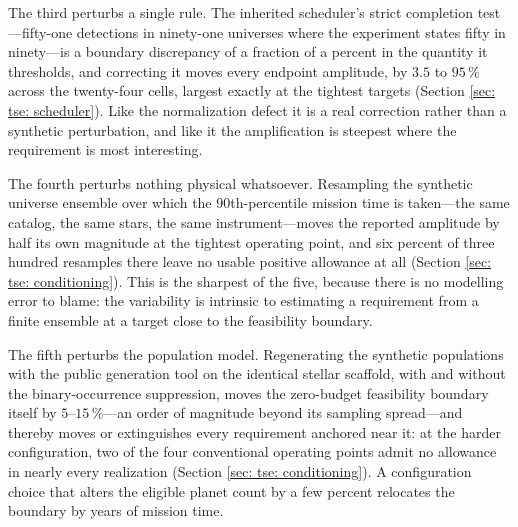 \documentclass[12pt,a4paper]{article}
\numberwithin{equation}{section}
\numberwithin{figure}{section}
\numberwithin{table}{section}
\begin{document}
The third perturbs a single rule. The inherited scheduler's strict completion test---fifty-one detections in ninety-one universes where the experiment states fifty in ninety---is a boundary discrepancy of a fraction of a percent in the quantity it thresholds, and correcting it moves every endpoint amplitude, by $3.5$ to $95\,\%$ across the twenty-four cells, largest exactly at the tightest targets (Section \ref{sec: tse: scheduler}). Like the normalization defect it is a real correction rather than a synthetic perturbation, and like it the amplification is steepest where the requirement is most interesting.

The fourth perturbs nothing physical whatsoever. Resampling the synthetic universe ensemble over which the 90th-percentile mission time is taken---the same catalog, the same stars, the same instrument---moves the reported amplitude by half its own magnitude at the tightest operating point, and six percent of three hundred resamples there leave no usable positive allowance at all (Section \ref{sec: tse: conditioning}). This is the sharpest of the five, because there is no modelling error to blame: the variability is intrinsic to estimating a requirement from a finite ensemble at a target close to the feasibility boundary.

The fifth perturbs the population model. Regenerating the synthetic populations with the public generation tool on the identical stellar scaffold, with and without the binary-occurrence suppression, moves the zero-budget feasibility boundary itself by $5$--$15\,\%$---an order of magnitude beyond its sampling spread---and thereby moves or extinguishes every requirement anchored near it: at the harder configuration, two of the four conventional operating points admit no allowance in nearly every realization (Section \ref{sec: tse: conditioning}). A configuration choice that alters the eligible planet count by a few percent relocates the boundary by years of mission time.
\end{document}

